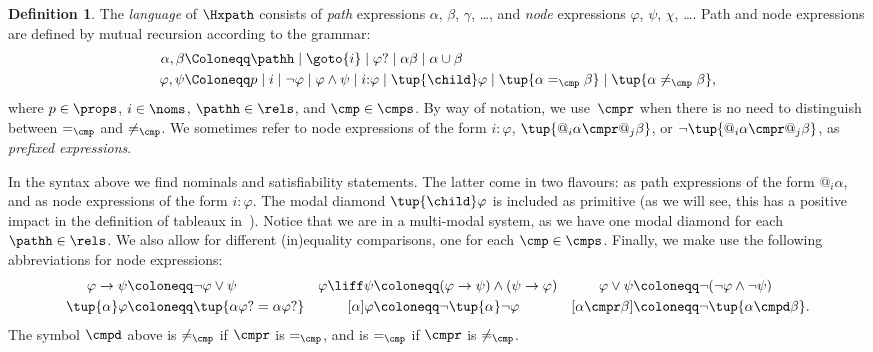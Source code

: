 \documentclass[10pt,a4paper]{amsart}
\theoremstyle{definition}
\newtheorem{defi}[thm]{Definition}
\theoremstyle{remark}
\begin{document}
\begin{defi}\label{def:language}
  The \emph{language} of $\Hxpath$ consists of \emph{path} expressions $\alpha$, $\beta$, $\gamma$, \dots, and \emph{node} expressions $\varphi$, $\psi$, $\chi$, \dots.
  Path and node expressions are defined by mutual recursion according to the grammar:
  \begin{align*}
    \alpha, \beta & \Coloneqq
        \pathh \mid
        \goto{i} \mid
        \varphi? \mid
        \alpha \beta \mid
        \alpha \cup \beta \\
    \varphi, \psi & \Coloneqq
        p \mid
        i \mid
        \lnot \varphi \mid
        \varphi \land \psi \mid
        i{:}\varphi \mid 
        \tup{\child} \varphi \mid
        \tup{\alpha =_{\cmp} \beta} \mid
        \tup{\alpha \neq_{\cmp} \beta},
  \end{align*}
  \noindent where $p\in\props$, $i\in\noms$, $\pathh\in\rels$, and $\cmp\in\cmps$.
  By way of notation, we use~$\cmpr$ when there is no need to distinguish between $=_\cmp$ and $\neq_\cmp$.
  We sometimes refer to node expressions of the form $i{:}\varphi$, $\tup{@_i\alpha \cmpr @_j\beta}$, or $\lnot\tup{@_i\alpha \cmpr @_j\beta}$, as \emph{prefixed expressions}. 
\end{defi}


In the syntax above we find nominals and satisfiability statements. The latter come in two flavours: as path expressions of the form $@_i\alpha$, and as node expressions of the form $i{:}\varphi$. The modal diamond $\tup{\child}\varphi$ is included as primitive (as we will see, this has a positive impact in the definition of tableaux in~).  Notice that we are in a multi-modal system, as we have one modal diamond for each $\pathh\in\rels$. We also allow for different (in)equality comparisons, one for each $\cmp\in\cmps$. 
%
Finally, we make use the following abbreviations for node expressions:
\begin{align*}
  \varphi \to \psi & \coloneqq \lnot\varphi \lor \psi   &
  \varphi \liff \psi & \coloneqq (\varphi \to \psi) \land (\psi \to \varphi) &
  \varphi \lor \psi & \coloneqq \lnot(\lnot\varphi \land \lnot\psi)  \\
  \tup{\alpha}\varphi & \coloneqq \tup{\alpha\varphi? = \alpha\varphi?} &
  [\alpha]\varphi & \coloneqq \lnot\tup{\alpha}\lnot\varphi &
  [\alpha \cmpr \beta] & \coloneqq \lnot\tup{\alpha \cmpd \beta}.
\end{align*}
The symbol ${\cmpd}$ above is ${\neq_\cmp}$ if ${\cmpr}$ is ${=_\cmp}$, and is ${=_\cmp}$ if ${\cmpr}$ is ${\neq_\cmp}$.
\end{document}
